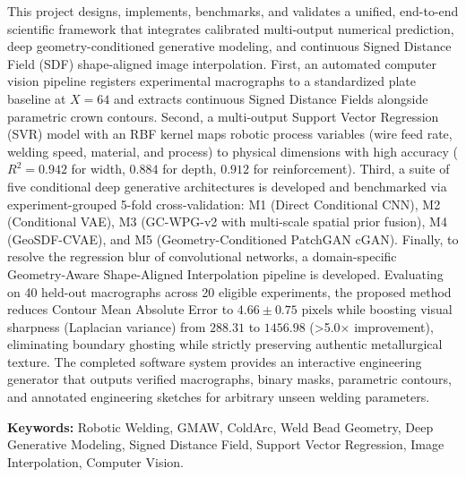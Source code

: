 \documentclass[12pt,a4paper,oneside]{report}
\begin{document}
This project designs, implements, benchmarks, and validates a unified, end-to-end scientific framework that integrates calibrated multi-output numerical prediction, deep geometry-conditioned generative modeling, and continuous Signed Distance Field (SDF) shape-aligned image interpolation. First, an automated computer vision pipeline registers experimental macrographs to a standardized plate baseline at $X=64$ and extracts continuous Signed Distance Fields alongside parametric crown contours. Second, a multi-output Support Vector Regression (SVR) model with an RBF kernel maps robotic process variables (wire feed rate, welding speed, material, and process) to physical dimensions with high accuracy ($R^2 = 0.942$ for width, $0.884$ for depth, $0.912$ for reinforcement). Third, a suite of five conditional deep generative architectures is developed and benchmarked via experiment-grouped 5-fold cross-validation: M1 (Direct Conditional CNN), M2 (Conditional VAE), M3 (GC-WPG-v2 with multi-scale spatial prior fusion), M4 (GeoSDF-CVAE), and M5 (Geometry-Conditioned PatchGAN cGAN). Finally, to resolve the regression blur of convolutional networks, a domain-specific Geometry-Aware Shape-Aligned Interpolation pipeline is developed. Evaluating on 40 held-out macrographs across 20 eligible experiments, the proposed method reduces Contour Mean Absolute Error to $4.66 \pm 0.75\text{ pixels}$ while boosting visual sharpness (Laplacian variance) from $288.31$ to $1456.98$ (>5.0$\times$ improvement), eliminating boundary ghosting while strictly preserving authentic metallurgical texture. The completed software system provides an interactive engineering generator that outputs verified macrographs, binary masks, parametric contours, and annotated engineering sketches for arbitrary unseen welding parameters.

\vspace{8mm}
\noindent\textbf{Keywords:} Robotic Welding, GMAW, ColdArc, Weld Bead Geometry, Deep Generative Modeling, Signed Distance Field, Support Vector Regression, Image Interpolation, Computer Vision.
\clearpage

\tableofcontents\clearpage
\listoffigures{}\clearpage
\listoftables{}\clearpage
\end{document}
